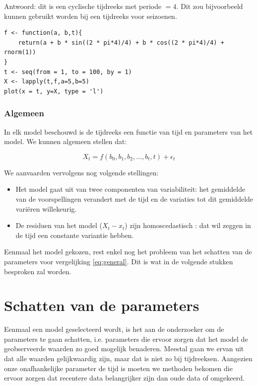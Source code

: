 Antwoord: dit is een cyclische tijdreeks met periode $= 4$. Dit zou bijvoorbeeld kunnen gebruikt worden bij een tijdreeks voor seizoenen. 

\begin{lstlisting}
f <- function(a, b,t){
	return(a + b * sin((2 * pi*4)/4) + b * cos((2 * pi*4)/4) + rnorm(1))
}
t <- seq(from = 1, to = 100, by = 1)
X <- lapply(t,f,a=5,b=5)
plot(x = t, y=X, type = 'l')
\end{lstlisting}

\subsubsection{Algemeen}

In elk model beschouwd is de tijdreeks een functie van tijd en parameters van het model. We kunnen algemeen stellen dat:

\begin{equation}
	X_{t} = f(b_{0}, b_{1}, b_{2}, \dots , b_{t}, t) + \epsilon_{t}
\label{eq:general}
\end{equation}

We aanvaarden vervolgens nog volgende stellingen:

\begin{itemize}
	\item Het model gaat uit van twee componenten van variabiliteit: het gemiddelde van de voorspellingen verandert met de tijd en de variaties tot dit gemiddelde variëren willekeurig.
	\item De residuen van het model ($X_{t} - x_{t}$) zijn homoscedastisch : dat wil zeggen in de tijd een constante variantie hebben.
\end{itemize}

Eenmaal het model gekozen, rest enkel nog het  probleem van het schatten van de parameters voor vergelijking \ref{eq:general}. Dit is wat in de volgende stukken besproken zal worden.

\section{Schatten van de parameters}

Eenmaal een model geselecteerd wordt, is het aan de onderzoeker om de parameters te gaan schatten, i.e. parameters die ervoor zorgen dat het model de geobserveerde waarden zo goed mogelijk benaderen. Meestal gaan we ervan uit dat alle waarden gelijkwaardig zijn, maar dat is niet zo bij tijdreeksen. Aangezien onze onafhankelijke parameter de tijd is moeten we methoden bekomen die ervoor zorgen dat recentere data belangrijker zijn dan oude data of omgekeerd. 

